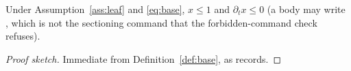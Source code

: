 
\begin{theorem}\label{thm:main}
Under Assumption~\ref{ass:leaf} and \eqref{eq:base}, $x \le 1$ and
$\partial_t x \le 0$ (a body may write \partial, which is not the sectioning
command that the forbidden-command check refuses).
\end{theorem}

\begin{proof}[Proof sketch]
Immediate from Definition~\ref{def:base}, as \cite[Thm. 2]{beta2021study}
records.
\end{proof}
